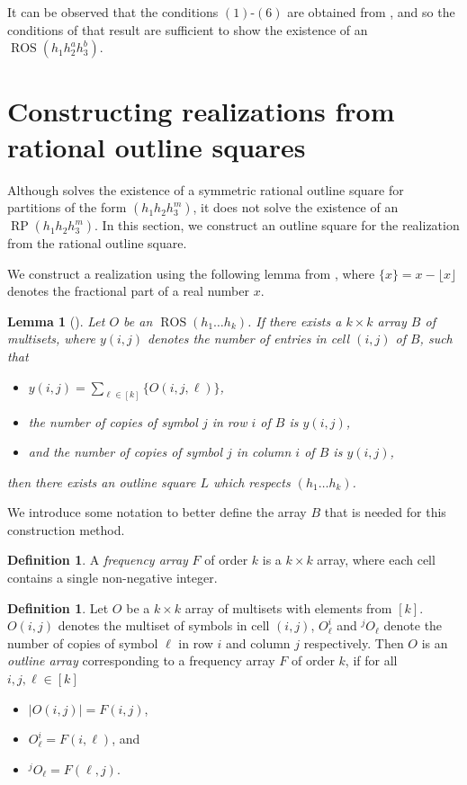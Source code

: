 \documentclass[preprint,nonatbib]{elsarticle}
\DeclareMathOperator{\LS}{RP}
\DeclareMathOperator{\ROS}{ROS}
\newtheorem{lemma}[theorem]{Lemma}
\theoremstyle{definition}
\newtheorem{definition}[theorem]{Definition}
\numberwithin{equation}{section}
\begin{document}
It can be observed that the conditions $(1)$-$(6)$ are obtained from , and so the conditions of that result are sufficient to show the existence of an $\ROS(h_1 h_2^a h_3^b)$.





\section{Constructing realizations from rational outline squares}

    Although  solves the existence of a symmetric rational outline square for partitions of the form $(h_1h_2h_3^m)$, it does not solve the existence of an $\LS(h_1h_2h_3^m)$. In this section, we construct an outline square for the realization from the rational outline square.

We construct a realization using the following lemma from \cite{kemp2024latin}, where $\{x\} = x - \lfloor x\rfloor$ denotes the fractional part of a real number $x$.

\begin{lemma}[\cite{kemp2024latin}]
\label{lemma: rational outline to full}
    Let $O$ be an $\ROS(h_1\dots h_k)$. If there exists a $k\times k$ array $B$ of multisets, where $y(i,j)$ denotes the number of entries in cell $(i,j)$ of $B$, such that
    \begin{itemize}
        \item $y(i,j) = \sum_{\ell\in[k]} \{O(i,j,\ell)\}$,
        \item the number of copies of symbol $j$ in row $i$ of $B$ is $y(i,j)$,
        \item and the number of copies of symbol $j$ in column $i$ of $B$ is $y(i,j)$,
    \end{itemize}
    then there exists an outline square $L$ which respects $(h_1\dots h_k)$.
\end{lemma}

We introduce some notation to better define the array $B$ that is needed for this construction method.

\begin{definition}
    A \emph{frequency array} $F$ of order $k$ is a $k\times k$ array, where each cell contains a single non-negative integer.
\end{definition}

\begin{definition}
    Let $O$ be a $k\times k$ array of multisets with elements from $[k]$. $O(i,j)$ denotes the multiset of symbols in cell $(i,j)$, $O_{\ell}^i$ and $^jO_\ell$ denote the number of copies of symbol $\ell$ in row $i$ and column $j$ respectively.
    Then $O$ is an \emph{outline array} corresponding to a frequency array $F$ of order $k$, if for all $i,j,\ell\in[k]$
    \begin{itemize}
        \item $|O(i,j)| = F(i,j)$,
        \item $O_\ell^i = F(i,\ell)$, and
        \item $^jO_\ell = F(\ell,j)$.
    \end{itemize}
\end{definition}
\end{document}
